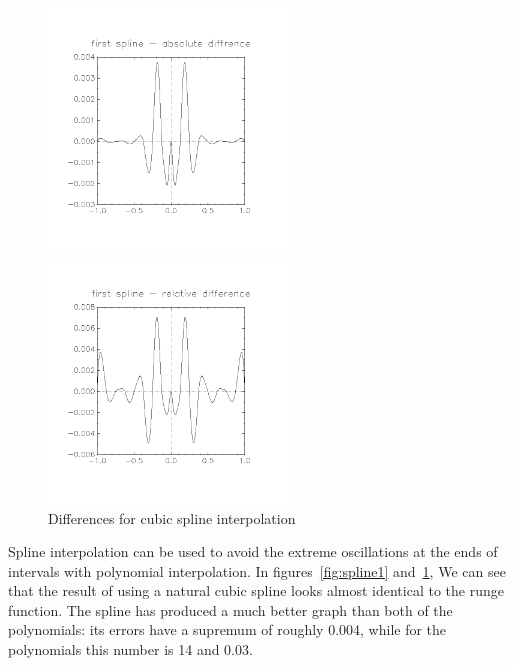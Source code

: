 \documentclass[11pt, a4paper, titlepage, openright]{article}
\begin{document}
    \begin{figure}[H]
        \begin{minipage}[b]{0.49\textwidth}
            \includegraphics[width=6.5cm, trim={2cm, 4cm, 2cm, 3cm}, clip]{../images/diff3abs}
        \end{minipage}
        \hfill
        \begin{minipage}[b]{0.49\textwidth}
            \includegraphics[width=6.5cm, trim={2cm, 4cm, 2cm, 3cm}, clip]{../images/diff3rel}
        \end{minipage}
        \caption{Differences for cubic spline interpolation}
        \label{fig:diff3}
    \end{figure}
    Spline interpolation can be used to avoid the extreme oscillations at the ends of intervals with polynomial interpolation.
    In figures~\ref{fig:spline1} and~\ref{fig:diff3}, We can see that the result of using a natural cubic spline looks almost identical to the runge function. The spline
    has produced a much better graph than both of the polynomials: its errors have a supremum of roughly 0.004,
    while for the polynomials this number is 14 and 0.03.
\end{document}
